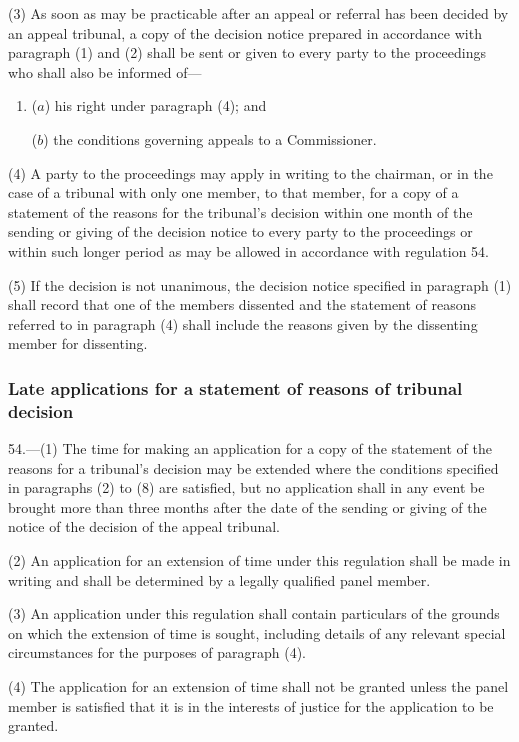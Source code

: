 \documentclass[12pt,a4paper]{article}
\begin{document}
(3) As soon as may be practicable after an appeal or referral has been decided by an appeal tribunal, a copy of the decision notice prepared in accordance with paragraph (1) and (2) shall be sent or given to every party to the proceedings who shall also be informed of—
\begin{enumerate}\item[]
($a$) his right under paragraph (4); and

($b$) the conditions governing appeals to a Commissioner.
\end{enumerate}

(4) A party to the proceedings may apply in writing to the chairman, or in the case of a tribunal with only one member, to that member, for a copy of a statement of the reasons for the tribunal’s decision within one month of the sending or giving of the decision notice to every party to the proceedings or within such longer period as may be allowed in accordance with regulation 54.

(5) If the decision is not unanimous, the decision notice specified in paragraph (1) shall record that one of the members dissented and the statement of reasons referred to in paragraph (4) shall include the reasons given by the dissenting member for dissenting.

\subsubsection[54. Late applications for a statement of reasons of tribunal decision]{Late applications for a statement of reasons of tribunal decision}

54.—(1) The time for making an application for a copy of the statement of the reasons for a tribunal’s decision may be extended where the conditions specified in paragraphs (2) to (8) are satisfied, but no application shall in any event be brought more than three months after the date of the sending or giving of the notice of the decision of the appeal tribunal.

(2) An application for an extension of time under this regulation shall be made in writing and shall be determined by a legally qualified panel member.

(3) An application under this regulation shall contain particulars of the grounds on which the extension of time is sought, including details of any relevant special circumstances for the purposes of paragraph (4).

(4) The application for an extension of time shall not be granted unless the panel member is satisfied that it is in the interests of justice for the application to be granted.
\end{document}
